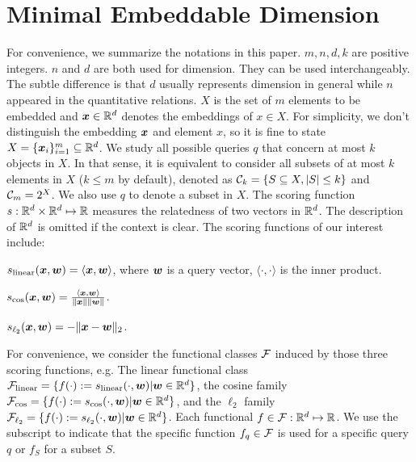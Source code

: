 \section{Minimal Embeddable Dimension}\label{sec:problem-definition}

For convenience, we summarize the notations in this paper.
$m, n, d, k$ are positive integers. $n$ and $d$ are both used for dimension. They can be used interchangeably. The subtle difference is that $d$ usually represents dimension in general while $n$ appeared in the quantitative relations. $X$ is the set of $m$ elements to be embedded and $\bm{x} \in \mathbb{R}^d$ denotes the embeddings of $x\in X$. For simplicity, we don't distinguish the embedding $\bm{x}$ and element $x$, so it is fine to state $X = \{\bm{x}_i\}_{i=1}^m \subseteq \mathbb{R}^d$.
We study all possible queries $q$ that concern at most $ k$ objects in $X$. In that sense, it is equivalent to consider all subsets of at most $k$ elements in $X$ ($k \leq m$ by default), denoted as $ \mathcal{C}_k=\{S\subseteq X, |S|\leq k\}$ and $\mathcal{C}_m=2^X$. We also use $q$ to denote a subset in $X$.
The scoring function $s: \mathbb{R}^d \times \mathbb{R}^d\mapsto \mathbb{R}$ measures the relatedness of two vectors in $\mathbb{R}^d$. The description of $\mathbb{R}^d$ is omitted if the context is clear. The scoring functions of our interest include:
\begin{compactdesc}
    \item[Linear:] $s_{\rm linear}(\bm{x}, \bm{w}) = \langle \bm{x}, \bm{w}\rangle$, where $\bm{w}$ is a query vector, $\langle \cdot, \cdot\rangle$ is the inner product.
    \item[Cosine similarity:] $s_{\cos}(\bm{x}, \bm{w}) = \frac{\langle \bm{x}, \bm{w} \rangle }{ \|\bm{x}\|\|\bm{w}\|}$.
    \item[Euclidean distance ($\ell_2$):] $s_{\ell_2}(\bm{x}, \bm{w}) = - \|\bm{x} - \bm{w}\|_2 $.
\end{compactdesc}
For convenience, we consider the functional classes $\mathcal{F}$ induced by those three scoring functions, e.g. The linear functional class $\mathcal{F}_{\rm linear} = \{f(\cdot ):= s_{\rm linear}(\cdot, \bm{w}) | \bm{w} \in \mathbb{R}^d\}$, the cosine family$\mathcal{F}_{\cos} = \{  f(\cdot ):= s_{\cos}(\cdot, \bm{w}) | \bm{w} \in \mathbb{R}^d\}$, and the $\ell_2$ family $\mathcal{F}_{\ell_{2}} = \{f(\cdot ):= s_{\ell_2}(\cdot, \bm{w}) | \bm{w} \in \mathbb{R}^d\}$. Each functional $f\in \mathcal{F}: \mathbb{R}^d\mapsto\mathbb{R}$. We use the subscript to indicate that the specific function $f_q\in \mathcal{F}$ is used for a specific query $q$ or $f_S$ for a subset $S$.



